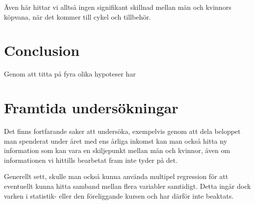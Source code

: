 \documentclass[]{article}
\begin{document}
\fi
Även här hittar vi alltså ingen signifikant skillnad mellan män och kvinnors köpvana, när det kommer till cykel och tillbehör.

\section{Conclusion}

Genom att titta på fyra olika hypoteser har 



\section{Framtida undersökningar}

Det finns fortfarande saker att undersöka, exempelvis genom att dela beloppet man spenderat under året med ens årliga inkomst kan man också hitta ny information som kan vara en skiljepunkt mellan män och kvinnor, även om informationen vi hittills bearbetat fram inte tyder på det.

Generellt sett, skulle man också kunna använda multipel regression för att eventuellt kunna hitta samband mellan flera variabler samtidigt. Detta ingår dock varken i statistik- eller den föreliggande kursen och har därför inte beaktats.
\end{document}
